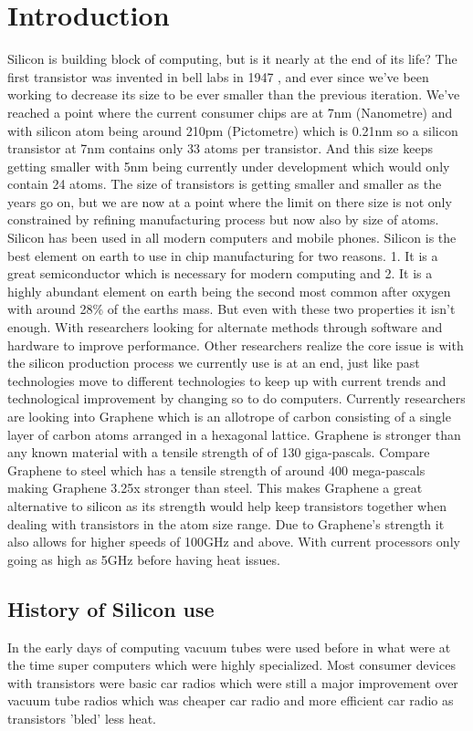 \documentclass[journal]{IEEEtran}
\begin{document}
\section{Introduction}
Silicon is building block of computing, but is it nearly at the end of its life? The first transistor was invented in bell labs in 1947 \cite{8896076320180101}, and ever since we've been working to decrease its size to be ever smaller than the previous iteration. We've reached a point where the current consumer chips are at 7nm (Nanometre) and with silicon atom \cite{8947487520180101} being around 210pm (Pictometre) which is 0.21nm so a silicon transistor at 7nm contains only 33 atoms per transistor. And this size keeps getting smaller with 5nm being currently under development which would only contain 24 atoms. The size of transistors is getting smaller and smaller as the years go on, but we are now at a point where the limit on there size is not only constrained by refining manufacturing process but now also by size of atoms. Silicon has been used in all modern computers and mobile phones. Silicon is the best element on earth to use in chip manufacturing for two reasons. 1. It is a great semiconductor which is necessary for modern computing and 2. It is a highly abundant element on earth being the second most common after oxygen with around 28\% of the earths mass. But even with these two properties it isn't enough. With researchers looking for alternate methods through software and hardware to improve performance. Other researchers realize the core issue is with the silicon production process we currently use is at an end, just like past technologies move to different technologies to keep up with current trends and technological improvement by changing so to do computers. Currently researchers are looking into Graphene \cite{nicol_2018} which is an allotrope of carbon consisting of a single layer of carbon atoms arranged in a hexagonal lattice. Graphene is stronger than any known material with a tensile strength of  of 130 giga-pascals. Compare Graphene to steel which has a tensile strength of around 400 mega-pascals making Graphene 3.25x stronger than steel. This makes Graphene a great alternative to silicon as its strength would help keep transistors together when dealing with transistors in the atom size range. Due to Graphene's strength it also allows for higher speeds of 100GHz \cite{johnson_2010} and above. With current processors only going as high as 5GHz before having heat issues.

\subsection{History of Silicon use}
In the early days of computing vacuum tubes \cite{8931727020180101} were used before in what were at the time super computers which were highly specialized. Most consumer devices with transistors were basic car radios which were still a major improvement over vacuum tube radios which was cheaper car radio and more efficient car radio as transistors 'bled' less heat.
\end{document}

